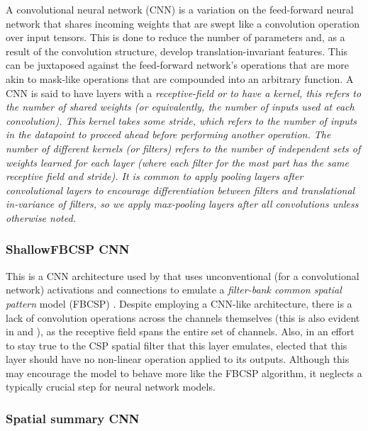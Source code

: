 \documentclass[utf8]{frontiersSCNS} %
\begin{document}
A convolutional neural network (CNN) \cite{LecunnMNIST, GoodfellowTextbook} is a variation on the feed-forward neural network that shares incoming weights that are swept like a convolution operation over input tensors. This is done to reduce the number of parameters and, as a result of the convolution structure, develop translation-invariant features. This can be juxtaposed against the feed-forward network's operations that are more akin to mask-like operations that are compounded into an arbitrary function. A CNN is said to have layers with a \em{receptive-field} or to have a \em{kernel}, this refers to the number of shared weights (or equivalently, the number of inputs used at each convolution). This kernel takes some {\em stride}, which refers to the number of inputs in the datapoint to proceed ahead before performing another operation. The number of different kernels (or filters) refers to the number of independent sets of weights learned for each layer (where each filter for the most part has the same receptive field and stride). It is common to apply pooling layers \cite{} after convolutional layers to encourage differentiation between filters and translational in-variance of filters, so we apply max-pooling \cite{} layers after all convolutions unless otherwise noted.

\subsubsection{ShallowFBCSP CNN}

This is a CNN architecture used by \cite{Schirrmeister2017} that uses unconventional (for a convolutional network) activations and connections to emulate a \emph{filter-bank common spatial pattern} model (FBCSP) \cite{KaiKengAng2008}. Despite employing a CNN-like architecture, there is a lack of convolution operations across the channels themselves (this is also evident in \cite{Lawhern2017} and \cite{Sun}), as the receptive field spans the entire set of channels. Also, in an effort to stay true to the CSP spatial filter that this layer emulates, \cite{Schirrmeister2017} elected that this layer should have no non-linear operation applied to its outputs. Although this may encourage the model to behave more like the FBCSP algorithm, it neglects a typically crucial step for neural network models.

\subsubsection{Spatial summary CNN} \label{sec:scnn}
\end{document}
